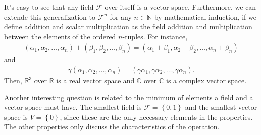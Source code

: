 \documentclass[12pt]{article}
\newcommand{\N}{\mathbb{N}}
\newcommand{\R}{\mathbb{R}}
\begin{document}
It's easy to see that any field $\mathcal{F}$ over itself is a vector space. Furthermore, we can extende this generalization to $\mathcal{F}^{n}$ for any $n\in \N$ by mathematical induction, if we define addition and scalar multiplication as the field addition and multiplication between the elements of the ordered $n$-tuples. For instance,
\begin{align*}
  (\alpha_{1},\alpha_{2},\dots,\alpha_{n}) + (\beta_{1},\beta_{2},\dots,\beta_{n}) = (\alpha_{1}+\beta_{1},\alpha_{2}+\beta_{2},\dots,\alpha_{n}+\beta_{n})
\end{align*}
and 
\begin{align*}
  \gamma(\alpha_{1},\alpha_{2},\dots,\alpha_{n}) =  (\gamma\alpha_{1},\gamma\alpha_{2},\dots,\gamma\alpha_{n}).
\end{align*}
Then,  $\R^{3}$ over $\R$ is a real vector space and $\mathbb{C}$ over $\mathbb{C}$ is a complex vector space.

Another interesting question is related to the minimum of elements a field and a vector space must have. The smallest field is $\mathcal{F} = \left\{ 0,1 \right\}$ and the smallest vector space is $V=\left\{ 0 \right\}$, since these are the only necessary elements in the properties. The other properties only discuss the characteristics of the operation.  
\end{document}
